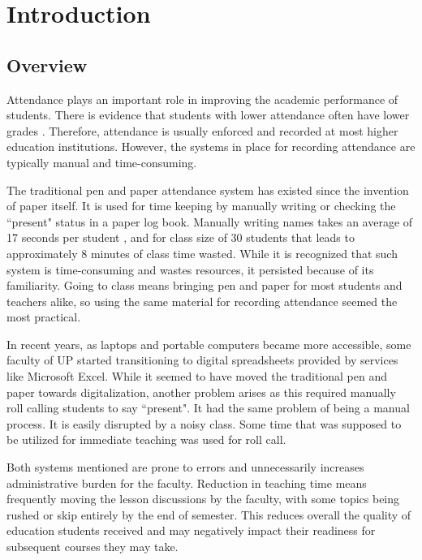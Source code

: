 \chapter{Introduction}
\label{sec:researchdesc}    %

\section{Overview}
\label{sec:overview}

Attendance plays an important role in improving the academic performance of students. There is evidence that students with lower attendance often have lower grades \cite{EJES3887}. Therefore, attendance is usually enforced and recorded at most higher education institutions. However, the systems in place for recording attendance are typically manual and time-consuming.

The traditional pen and paper attendance system has existed since the invention of paper itself. It is used for time keeping by manually writing or checking the ``present" status in a paper log book. Manually writing names takes an average of 17 seconds per student \cite{shoewu:2014}, and for class size of 30 students that leads to approximately 8 minutes of class time wasted. While it is recognized that such system is time-consuming and wastes resources, it persisted because of its familiarity. Going to class means bringing pen and paper for most students and teachers alike, so using the same material for recording attendance seemed the most practical.

In recent years, as laptops and portable computers became more accessible, some faculty of UP started transitioning to digital spreadsheets provided by services like Microsoft Excel. While it seemed to have moved the traditional pen and paper towards digitalization, another problem arises as this required manually roll calling students to say ``present". It had the same problem of being a manual process. It is easily disrupted by a noisy class. Some time that was supposed to be utilized for immediate teaching was used for roll call.

Both systems mentioned are prone to errors and unnecessarily increases administrative burden for the faculty. Reduction in teaching time means frequently moving the lesson discussions by the faculty, with some topics being rushed or skip entirely by the end of semester. This reduces overall the quality of education students received and may negatively impact their readiness for subsequent courses they may take. 

